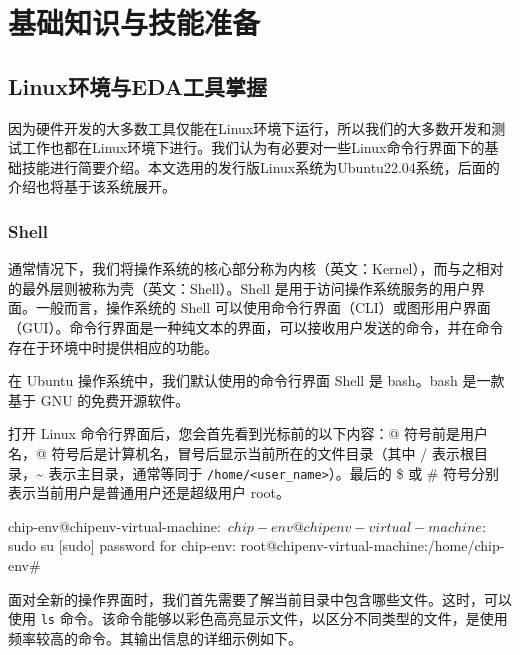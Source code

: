 
\chapter{基础知识与技能准备}\label{chap:01-hardware-preparation}

\section{Linux环境与EDA工具掌握}\label{sec:01-hardware-preparation-001}

因为硬件开发的大多数工具仅能在Linux环境下运行，所以我们的大多数开发和测试工作也都在Linux环境下进行。我们认为有必要对一些Linux命令行界面下的基础技能进行简要介绍。本文选用的发行版Linux系统为Ubuntu22.04系统，后面的介绍也将基于该系统展开。

\subsection{Shell}\label{sec:01-hardware-preparation-002}

通常情况下，我们将操作系统的核心部分称为内核（英文：Kernel），而与之相对的最外层则被称为壳（英文：Shell）。Shell 是用于访问操作系统服务的用户界面。一般而言，操作系统的 Shell 可以使用命令行界面（CLI）或图形用户界面（GUI）。命令行界面是一种纯文本的界面，可以接收用户发送的命令，并在命令存在于环境中时提供相应的功能。

在 Ubuntu 操作系统中，我们默认使用的命令行界面 Shell 是 bash。bash 是一款基于 GNU 的免费开源软件。

打开 Linux 命令行界面后，您会首先看到光标前的以下内容：@ 符号前是用户名，@ 符号后是计算机名，冒号后显示当前所在的文件目录（其中 / 表示根目录，\textasciitilde{} 表示主目录，通常等同于 \texttt{/home/\textless{}user\_name\textgreater{}}）。最后的 \$ 或 \# 符号分别表示当前用户是普通用户还是超级用户 root。

\begin{CodeBlock}[language=BookShell]
chip-env@chipenv-virtual-machine:~$ 
chip-env@chipenv-virtual-machine:~$ sudo su
[sudo] password for chip-env: 
root@chipenv-virtual-machine:/home/chip-env# 
\end{CodeBlock}

面对全新的操作界面时，我们首先需要了解当前目录中包含哪些文件。这时，可以使用 \texttt{ls} 命令。该命令能够以彩色高亮显示文件，以区分不同类型的文件，是使用频率较高的命令。其输出信息的详细示例如下。


